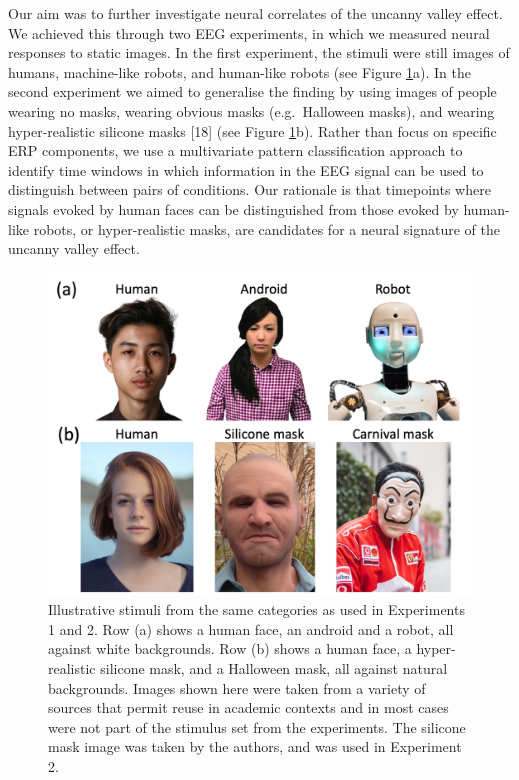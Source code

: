 \documentclass[
]{article}
\begin{document}
Our aim was to further investigate neural correlates of the uncanny valley effect. We achieved this through two EEG experiments, in which we measured neural responses to static images. In the first experiment, the stimuli were still images of humans, machine-like robots, and human-like robots (see Figure \ref{fig:stimexamples}a). In the second experiment we aimed to generalise the finding by using images of people wearing no masks, wearing obvious masks (e.g.~Halloween masks), and wearing hyper-realistic silicone masks {[}18{]} (see Figure \ref{fig:stimexamples}b). Rather than focus on specific ERP components, we use a multivariate pattern classification approach to identify time windows in which information in the EEG signal can be used to distinguish between pairs of conditions. Our rationale is that timepoints where signals evoked by human faces can be distinguished from those evoked by human-like robots, or hyper-realistic masks, are candidates for a neural signature of the uncanny valley effect.

\begin{figure}

{\centering \includegraphics[width=0.8\linewidth]{Figures/stimfigure} 

}

\caption{Illustrative stimuli from the same categories as used in Experiments 1 and 2. Row (a) shows a human face, an android and a robot, all against white backgrounds. Row (b) shows a human face, a hyper-realistic silicone mask, and a Halloween mask, all against natural backgrounds. Images shown here were taken from a variety of sources that permit reuse in academic contexts and in most cases were not part of the stimulus set from the experiments. The silicone mask image was taken by the authors, and was used in Experiment 2.}\label{fig:stimexamples}
\end{figure}
\end{document}
